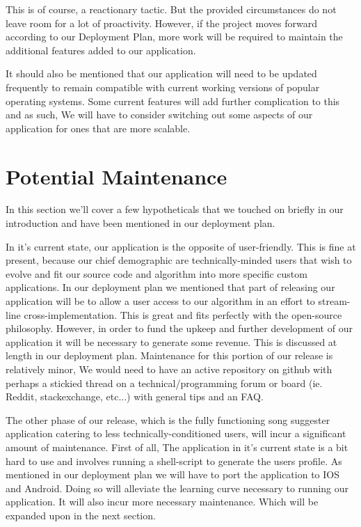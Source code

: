 \documentclass{roffin}
\begin{document}
This is of course, a reactionary tactic. But the provided circumstances do not leave room for a lot of proactivity. However, if the project moves forward according to our Deployment Plan, more work will be required to maintain the additional features added to our application. 

It should also be mentioned that our application will need to be updated frequently to remain compatible with current working versions of popular operating systems. Some current features will add further complication to this and as such, We will have to consider switching out some aspects of our application for ones that are more scalable. 


\section{Potential Maintenance}

In this section we'll cover a few hypotheticals that we touched on briefly in our introduction and have been mentioned in our deployment plan. 

In it's current state, our application is the opposite of user-friendly. This is fine at present, because our chief demographic are technically-minded users that wish to evolve and fit our source code and algorithm into more specific custom applications. In our deployment plan we mentioned that part of releasing our application will be to allow a user access to our algorithm in an effort to stream-line cross-implementation. This is great and fits perfectly with the open-source philosophy. However, in order to fund the upkeep and further development of our application it will be necessary to generate some revenue. This is discussed at length in our deployment plan. Maintenance for this portion of our release is relatively minor, We would need to have an active repository on github with perhaps a stickied thread on a technical/programming forum or board (ie. Reddit, stackexchange, etc...) with general tips and an FAQ.

The other phase of our release, which is the fully functioning song suggester application catering to less technically-conditioned users, will incur a significant amount of maintenance. First of all, The application in it's current state is a bit hard to use and involves running a shell-script to generate the users profile. As mentioned in our deployment plan we will have to port the application to IOS and Android. Doing so will alleviate the learning curve necessary to running our application. It will also incur more necessary maintenance. Which will be expanded upon in the next section. 
\end{document}
